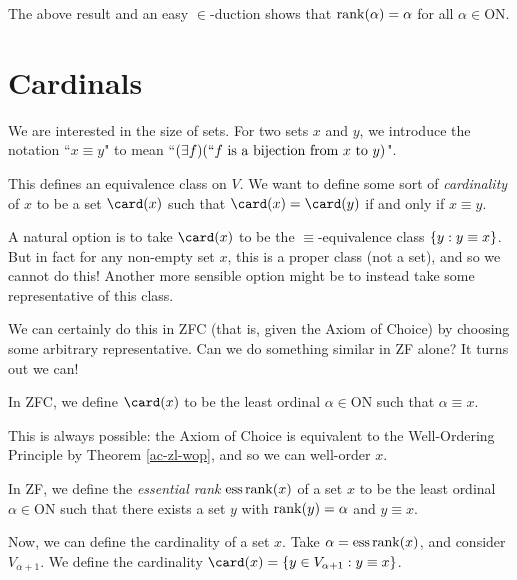 \documentclass{article}
\begin{document}
\begin{corollary}
    The above result and an easy $\in$-duction shows that $\operatorname{rank}(\alpha) = \alpha$ for all $\alpha \in \mathrm{ON}$.
\end{corollary}


\pagebreak
\section{Cardinals}

We are interested in the size of sets. For two sets $x$ and $y$, we introduce the notation ``$x \equiv y$" to mean ``$(\exists f)(``f \text{ is a bijection from $x$ to $y$})$".

This defines an equivalence class on $V$. We want to define some sort of \textit{cardinality} of $x$ to be a set $\card(x)$ such that $\card(x) = \card(y)$ if and only if $x \equiv y$.

A natural option is to take $\card(x)$ to be the $\equiv$-equivalence class $\left\lbrace y : y \equiv x \right\rbrace$. But in fact for any non-empty set $x$, this is a proper class (not a set), and so we cannot do this! Another more sensible option might be to instead take some representative of this class.

We can certainly do this in ZFC (that is, given the Axiom of Choice) by choosing some arbitrary representative. Can we do something similar in ZF alone? It turns out we can!

\begin{definition}
    In ZFC, we define $\card(x)$ to be the least ordinal $\alpha \in \mathrm{ON}$ such that $\alpha \equiv x$.
\end{definition}

\begin{note}
	This is always possible: the Axiom of Choice is equivalent to the Well-Ordering Principle by Theorem \ref{ac-zl-wop}, and so we can well-order $x$.
\end{note}

\begin{definition}[Cardinality in ZF]
    In ZF, we define the \textit{essential rank} $\mathrm{ess} \operatorname{rank}(x)$ of a set $x$ to be the least ordinal $\alpha \in \mathrm{ON}$ such that there exists a set $y$ with $\operatorname{rank}(y) = \alpha$ and $y \equiv x$.
    
    Now, we can define the cardinality of a set $x$. Take $\alpha = \mathrm{ess} \operatorname{rank}(x)$, and consider $V_{\alpha + 1}$. We define the cardinality $\card(x) = \set{y \in V_{\alpha + 1} : y \equiv x}$.
\end{definition}
\end{document}
